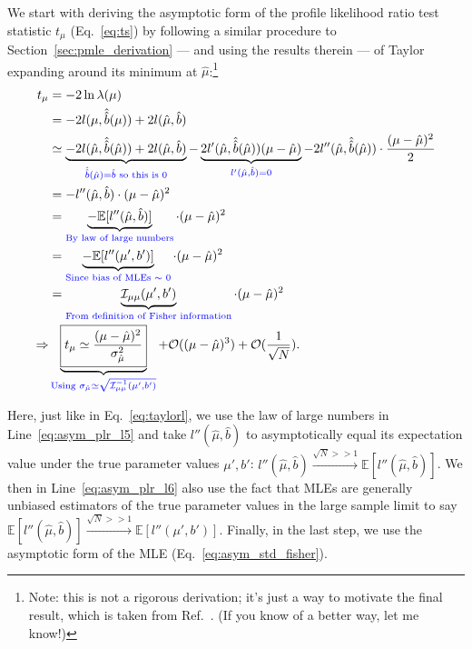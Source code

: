 We start with deriving the asymptotic form of the profile likelihood ratio test statistic $t_\mu$ (Eq.~\ref{eq:ts}) by following a similar procedure to Section~\ref{sec:pmle_derivation} --- and using the results therein --- of Taylor expanding around its minimum at $\hat\mu$:\footnote{Note: this is not a rigorous derivation; it's just a way to motivate the final result, which is taken from Ref.~\cite{Cowan:2010js}.
(If you know of a better way, let me know!)}
\begin{align}
    t_\mu &= -2\ln\lambda(\mu) \\
         &= -2l(\mu, \hat{\hat{b}}(\mu)) + 2l(\hat\mu, \hat{b}) \\
         &\simeq
        \underbrace{-2l(\hat\mu, \hat{\hat{b}}(\hat\mu)) + 2l(\hat\mu, \hat{b})}_{\textcolor{blue}{\hat{\hat{b}}(\hat\mu)=\hat b \text{ so this is 0}}} -
        \underbrace{2l'(\hat\mu, \hat{\hat{b}}(\hat\mu))(\mu-\hat\mu)}_{\textcolor{blue}{l'(\hat\mu, \hat b) = 0}} - 2l''(\hat\mu, \hat{\hat{b}}(\hat\mu))\cdot\frac{(\mu-\hat\mu)^2}{2} \\
        &= -l''(\hat\mu, \hat b) \cdot (\mu-\hat\mu)^2 \\
        &= \underbrace{-\mathbb E[l''(\hat\mu, \hat b)]}_{\textcolor{blue}{\text{By law of large numbers}}} \cdot (\mu-\hat\mu)^2 \label{eq:asym_plr_l5} \\
        &= \underbrace{-\mathbb E[l''(\mu', b')]}_{\textcolor{blue}{\text{Since bias of MLEs $\sim$ 0}}} \cdot (\mu-\hat\mu)^2 \label{eq:asym_plr_l6} \\
        &= \underbrace{\mathcal I_{\mu\mu}(\mu', b')}_{\textcolor{blue}{\text{From definition of Fisher information}}} \cdot (\mu-\hat\mu)^2 \\
 \Rightarrow  & \underbrace{\boxed{t_\mu \simeq \frac{(\mu-\hat\mu)^2}{\sigma_{\hat\mu}^2}}}_{\textcolor{blue}{\text{Using } \sigma_{\hat\mu} \simeq \sqrt{\mathcal I^{-1}_{\mu\mu}(\mu', b')}}} + \mathcal O((\mu-\hat\mu)^3) + \mathcal O(\frac{1}{\sqrt N}).
\label{eq:plr_taylor}
\end{align}

Here, just like in Eq.~\ref{eq:taylorl}, we use the law of large numbers in Line~\ref{eq:asym_plr_l5} and take $l''(\hat\mu, \hat b)$ to asymptotically equal its expectation value under the true parameter values $\mu', b'$: $l''(\hat\mu, \hat b) \xrightarrow{\sqrt{N} >> 1} \mathbb E[l''(\hat\mu, \hat b)]$.
We then in Line~\ref{eq:asym_plr_l6} also use the fact that MLEs are generally unbiased estimators of the true parameter values in the large sample limit to say $\mathbb E[l''(\hat\mu, \hat b)] \xrightarrow{\sqrt{N} >> 1} \mathbb E[l''(\mu', b')]$.
Finally, in the last step, we use the asymptotic form of the MLE (Eq.~\ref{eq:asym_std_fisher}).


